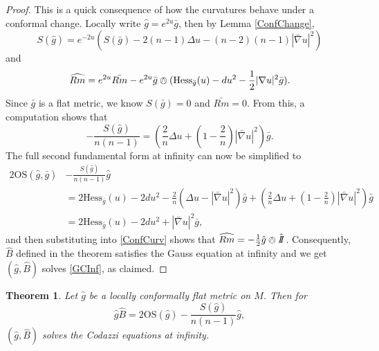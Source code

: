 \documentclass{amsart}
\newcommand{\two}{I\!\!I}
\newtheorem{thm}{Theorem}[section]
\begin{document}
\begin{proof}
This is a quick consequence of how the curvatures behave under a conformal change.
Locally write $\hat{g} = e^{2u}\bar{g}$, then by Lemma \ref{ConfChange},
\[
S(\hat{g}) = e^{-2u}(S(\bar{g}) -2(n-1)\Delta u  - (n-2)(n-1)|\bar{\nabla}u|^2)
\]
and
\begin{equation}
\label{ConfCurv}
\widehat{Rm} = e^{2u}\bar{Rm} - e^{2u}\bar{g}\owedge(\mathrm{Hess}_{\bar{g}}(u) - du^2 - \frac{1}{2}|\nabla u|^2\bar{g}).
\end{equation}
Since $\bar{g}$ is a flat metric, we know $S(\bar{g}) = 0$ and $\bar{Rm} = 0$.
From this, a computation shows that
\[
-\frac{S(\hat{g})}{n(n-1)} = \left( \frac{2}{n}\Delta u + \left(1 - \frac{2}{n}\right)|\bar{\nabla}u|^2 \right)\bar{g}.
\]
The full second fundamental form at infinity can now be simplified to 
\begin{align}
2\mathrm{OS}(\hat{g},\bar{g}) &- \frac{S(\hat{g})}{n(n-1)}\hat{g} \nonumber \\
&= 2\mathrm{Hess}_{\bar{g}}(u) - 2du^2 - \frac{2}{n}\left(\Delta u - |\bar{\nabla}u|^2\right)\bar{g} + \left( \frac{2}{n}\Delta u + \left(1 - \frac{2}{n}\right)|\bar{\nabla}u|^2 \right)\bar{g} \nonumber \\
&= 2\mathrm{Hess}_{\bar{g}}(u) - 2 du^2 + |\bar{\nabla}u|^2 \bar{g}, \label{OSu}
\end{align}
and then substituting into \eqref{ConfCurv} shows that $\widehat{Rm} = -\frac{1}{2}\hat{g}\owedge \hat{\two}$.
Consequently, $\hat{B}$ defined in the theorem satisfies the Gauss equation at infinity and we get $(\hat{g},\hat{B})$ solves \ref{GCInf}, as claimed.
\end{proof}

\begin{thm}
\label{MainThmCodazzi}
Let $\hat{g}$ be a locally conformally flat metric on $M$. Then for 
\[
\hat{g} \hat{B} = 2\mathrm{OS}(\hat{g}) - \frac{S(\hat{g})}{n(n-1)}\hat{g},
\]
$(\hat{g},\hat{B})$ solves the Codazzi equations at infinity.
\end{thm}
\end{document}
